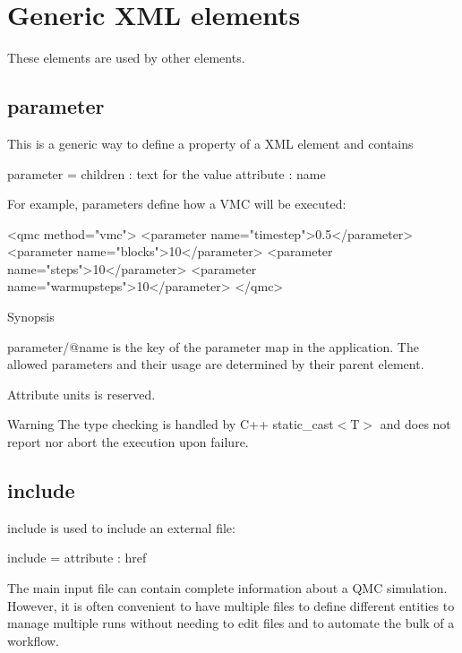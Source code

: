  \section{Generic X\-M\-L elements}\label{a00004_gen-xml}
These elements are used by other elements.\subsection{parameter}\label{a00004_parameterX}
This is a generic way to define a property of a X\-M\-L element and contains 
\begin{DoxyCode}
parameter = 
  children  : text \textcolor{keywordflow}{for} the value
  attribute : name
\end{DoxyCode}


For example, {\ttfamily parameter}s define how a V\-M\-C will be executed\-: 
\begin{DoxyCode}
<qmc method=\textcolor{stringliteral}{"vmc"}>
  <parameter name=\textcolor{stringliteral}{"timestep"}>0.5</parameter>
  <parameter name=\textcolor{stringliteral}{"blocks"}>10</parameter>
  <parameter name=\textcolor{stringliteral}{"steps"}>10</parameter>
  <parameter name=\textcolor{stringliteral}{"warmupsteps"}>10</parameter>
</qmc>
\end{DoxyCode}


Synopsis
\begin{DoxyItemize}
\item {\ttfamily parameter/@name} is the key of the parameter map in the application. The allowed {\ttfamily parameter}s and their usage are determined by their parent element.
\item Attribute {\ttfamily units} is reserved.
\end{DoxyItemize}

\begin{DoxyWarning}{Warning}
The type checking is handled by C++ {\ttfamily static\-\_\-cast$<$T$>$} and does not report nor abort the execution upon failure.
\end{DoxyWarning}
\subsection{include}\label{a00004_includeX}
{\ttfamily include} is used to include an external file\-: 
\begin{DoxyCode}
include = attribute : href
\end{DoxyCode}


The main input file can contain complete information about a Q\-M\-C simulation. However, it is often convenient to have multiple files to define different entities to manage multiple runs without needing to edit files and to automate the bulk of a workflow.


